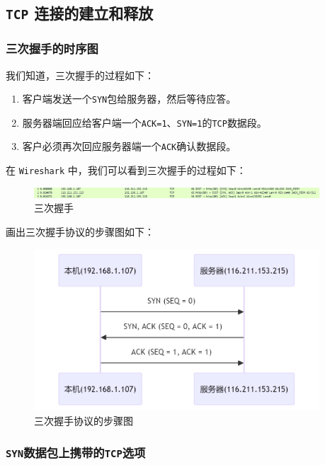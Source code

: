 \documentclass{article}
\begin{document}
\subsection{\texttt{TCP} 连接的建立和释放}

\subsubsection{三次握手的时序图}

我们知道，三次握手的过程如下：

\begin{enumerate}[noitemsep]
  \item 客户端发送一个\texttt{SYN}包给服务器，然后等待应答。
  \item 服务器端回应给客户端一个\texttt{ACK=1}、\texttt{SYN=1}的\texttt{TCP}数据段。
  \item 客户必须再次回应服务器端一个\texttt{ACK}确认数据段。
\end{enumerate}

在 \texttt{Wireshark} 中，我们可以看到三次握手的过程如下：

\begin{figure}[H]
  \centering
  \includegraphics[width=0.95\textwidth]{img/6.png}
  \caption{三次握手}
\end{figure}

画出三次握手协议的步骤图如下：

\begin{figure}[H]
  \centering
  \includegraphics[width=0.95\textwidth]{img/7.png}
  \caption{三次握手协议的步骤图}
\end{figure}

\subsubsection{\texttt{SYN}数据包上携带的\texttt{TCP}选项}
\end{document}
